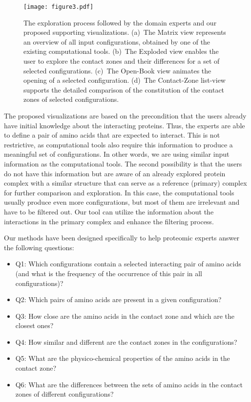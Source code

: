 \documentclass[twocolumn]{bmcart}%
\def\OpBook {Open-Book view\xspace}
\def\ExpView {Exploded view\xspace}
\def\MatView {Matrix view\xspace}
\def\CoZoListView {Contact-Zone list-view\xspace}
\begin{document}
\begin{figure}[tb]
  \centering	
  \texttt{[image: figure3.pdf]}
  \caption{
  The exploration process followed by the domain experts and our proposed supporting visualizations. (a)~The \MatView represents an overview of all input configurations, obtained by one of the existing computational tools. (b)~The \ExpView enables the user to explore the contact zones and their differences for a set of selected configurations. (c)~The \OpBook animates the opening of a selected configuration. (d)~The \CoZoListView supports the detailed comparison of the constitution of the contact zones of selected configurations.}
  \label{fig:workflow}
\end{figure}

The proposed visualizations are based on the precondition that the users already have initial knowledge about the interacting proteins.
Thus, the experts are able to define a pair of amino acids that are expected to interact.
This is not restrictive, as computational tools also require this information to produce a meaningful set of configurations. 
In other words, we are using similar input information as the computational tools.
The second possibility is that the users do not have this information but are aware of an already explored protein complex with a similar structure that can serve as a reference (primary) complex for further comparison and exploration. 
In this case, the computational tools usually produce even more configurations, but most of them are irrelevant and have to be filtered out. 
Our tool can utilize the information about the interactions in the primary complex and enhance the filtering process.

Our methods have been designed specifically to help proteomic experts answer the following questions:
\begin{itemize}
\item Q1: Which configurations contain a selected interacting pair of amino acids (and what is the frequency of the occurrence of this pair in all configurations)?
\item Q2: Which pairs of amino acids are present in a given configuration?
\item Q3: How close are the amino acids in the contact zone and which are the closest ones?
\item Q4: How similar and different are the contact zones in the configurations?
\item Q5: What are the physico-chemical properties of the amino acids in the contact zone?
\item Q6: What are the differences between the sets of amino acids in the contact zones of different configurations?
\end{itemize}
\end{document}
